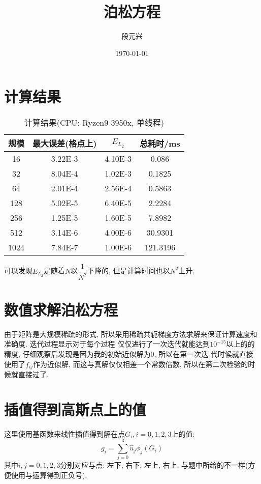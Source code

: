\documentclass[UTF8]{ctexart}
\title{泊松方程}
\author{段元兴}
\date{\today}
\begin{document}
\maketitle
\thispagestyle{empty}
\setcounter{page}{1}
\newpage
\tableofcontents
\newpage
    \section{计算结果}
        \begin{table}[H]
            \centering
            \caption{计算结果(CPU: Ryzen9 3950x, 单线程)}
            \begin{tabular}{|c|c|c|c|}
                \hline
                规模&最大误差(格点上)&$E_{L_2}$&总耗时/ms\\
                \hline
                16&3.22E-3&4.10E-3&0.086\\
                \hline
                32&8.04E-4&1.02E-3&0.1825\\
                \hline
                64&2.01E-4&2.56E-4&0.5863\\
                \hline
                128&5.02E-5&6.40E-5&2.2284\\
                \hline
                256&1.25E-5&1.60E-5&7.8982\\
                \hline
                512&3.14E-6&4.00E-6&30.9301\\
                \hline
                1024&7.84E-7&1.00E-6&121.3196\\
                \hline
            \end{tabular}
        \end{table}
        可以发现$E_{L_2}$是随着$N$以$\dfrac{1}{N^2}$下降的, 但是计算时间也以$N^2$上升.
    \section{数值求解泊松方程}
        \indent 由于矩阵是大规模稀疏的形式, 所以采用稀疏共轭梯度方法求解来保证计算速度和准确度. 迭代过程显示对于每个过程
        仅仅进行了一次迭代就能达到$10^{-15}$以上的的精度, 仔细观察后发现是因为我的初始近似解为0, 所以在第一次迭
        代时候就直接使用了$f_{ij}$作为近似解, 而这与真解仅仅相差一个常数倍数, 所以在第二次检验的时候就直接过了.
    \section{插值得到高斯点上的值}
        \indent 这里使用基函数来线性插值得到解在点$G_i, i=0,1,2,3$上的值:
        \begin{equation}
            g_i=\sum\limits_{j=0}^3\hat{u}_j\phi_j(G_i)
        \end{equation}
        其中$i, j=0,1,2,3$分别对应与点: 左下, 右下, 左上, 右上, 与题中所给的不一样(方便使用与运算得到正负号).
\end{document}
